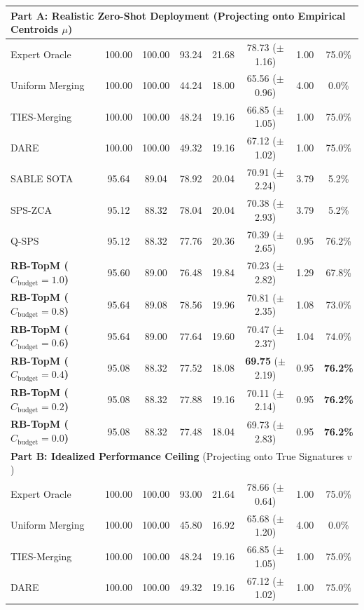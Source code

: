 \begin{table}[t]
\begin{center}
\begin{footnotesize}
\begin{sc}
{\begin{tabular}{lccccccc}
\multicolumn{8}{l}{\textbf{Part A: Realistic Zero-Shot Deployment} (Projecting onto Empirical Centroids $\mu$)} \\
\midrule
Expert Oracle & 100.00 & 100.00 & 93.24 & 21.68 & 78.73 ($\pm$1.16) & 1.00 & 75.0\% \\
Uniform Merging & 100.00 & 100.00 & 44.24 & 18.00 & 65.56 ($\pm$0.96) & 4.00 & 0.0\% \\
TIES-Merging & 100.00 & 100.00 & 48.24 & 19.16 & 66.85 ($\pm$1.05) & 1.00 & 75.0\% \\
DARE & 100.00 & 100.00 & 49.32 & 19.16 & 67.12 ($\pm$1.02) & 1.00 & 75.0\% \\
SABLE SOTA & 95.64 & 89.04 & 78.92 & 20.04 & 70.91 ($\pm$2.24) & 3.79 & 5.2\% \\
SPS-ZCA & 95.12 & 88.32 & 78.04 & 20.04 & 70.38 ($\pm$2.93) & 3.79 & 5.2\% \\
Q-SPS & 95.12 & 88.32 & 77.76 & 20.36 & 70.39 ($\pm$2.65) & 0.95 & 76.2\% \\
\midrule
\textbf{RB-TopM ($C_{\text{budget}} = 1.0$)} & 95.60 & 89.00 & 76.48 & 19.84 & 70.23 ($\pm$2.82) & 1.29 & 67.8\% \\
\textbf{RB-TopM ($C_{\text{budget}} = 0.8$)} & 95.64 & 89.08 & 78.56 & 19.96 & 70.81 ($\pm$2.35) & 1.08 & 73.0\% \\
\textbf{RB-TopM ($C_{\text{budget}} = 0.6$)} & 95.64 & 89.00 & 77.64 & 19.60 & 70.47 ($\pm$2.37) & 1.04 & 74.0\% \\
\textbf{RB-TopM ($C_{\text{budget}} = 0.4$)} & 95.08 & 88.32 & 77.52 & 18.08 & \textbf{69.75} ($\pm$2.19) & 0.95 & \textbf{76.2\%} \\
\textbf{RB-TopM ($C_{\text{budget}} = 0.2$)} & 95.08 & 88.32 & 77.88 & 19.16 & 70.11 ($\pm$2.14) & 0.95 & \textbf{76.2\%} \\
\textbf{RB-TopM ($C_{\text{budget}} = 0.0$)} & 95.08 & 88.32 & 77.48 & 18.04 & 69.73 ($\pm$2.83) & 0.95 & \textbf{76.2\%} \\
\midrule
\multicolumn{8}{l}{\textbf{Part B: Idealized Performance Ceiling} (Projecting onto True Signatures $v$)} \\
\midrule
Expert Oracle & 100.00 & 100.00 & 93.00 & 21.64 & 78.66 ($\pm$0.64) & 1.00 & 75.0\% \\
Uniform Merging & 100.00 & 100.00 & 45.80 & 16.92 & 65.68 ($\pm$1.20) & 4.00 & 0.0\% \\
TIES-Merging & 100.00 & 100.00 & 48.24 & 19.16 & 66.85 ($\pm$1.05) & 1.00 & 75.0\% \\
DARE & 100.00 & 100.00 & 49.32 & 19.16 & 67.12 ($\pm$1.02) & 1.00 & 75.0\% \\

\end{tabular}}
\end{sc}
\end{footnotesize}
\end{center}
\end{table}
